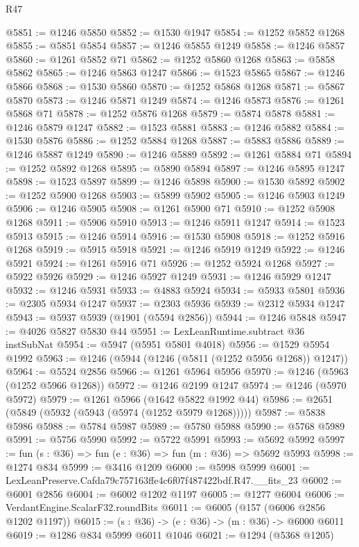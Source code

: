 \begin{lexlean}{R47}
\begin{coremodule}
@5851 := @1246 @5850
@5852 := @1530 @1947
@5854 := @1252 @5852 @1268
@5855 := @5851 @5854
@5857 := @1246 @5855 @1249
@5858 := @1246 @5857
@5860 := @1261 @5852 @71
@5862 := @1252 @5860 @1268
@5863 := @5858 @5862
@5865 := @1246 @5863 @1247
@5866 := @1523 @5865
@5867 := @1246 @5866
@5868 := @1530 @5860
@5870 := @1252 @5868 @1268
@5871 := @5867 @5870
@5873 := @1246 @5871 @1249
@5874 := @1246 @5873
@5876 := @1261 @5868 @71
@5878 := @1252 @5876 @1268
@5879 := @5874 @5878
@5881 := @1246 @5879 @1247
@5882 := @1523 @5881
@5883 := @1246 @5882
@5884 := @1530 @5876
@5886 := @1252 @5884 @1268
@5887 := @5883 @5886
@5889 := @1246 @5887 @1249
@5890 := @1246 @5889
@5892 := @1261 @5884 @71
@5894 := @1252 @5892 @1268
@5895 := @5890 @5894
@5897 := @1246 @5895 @1247
@5898 := @1523 @5897
@5899 := @1246 @5898
@5900 := @1530 @5892
@5902 := @1252 @5900 @1268
@5903 := @5899 @5902
@5905 := @1246 @5903 @1249
@5906 := @1246 @5905
@5908 := @1261 @5900 @71
@5910 := @1252 @5908 @1268
@5911 := @5906 @5910
@5913 := @1246 @5911 @1247
@5914 := @1523 @5913
@5915 := @1246 @5914
@5916 := @1530 @5908
@5918 := @1252 @5916 @1268
@5919 := @5915 @5918
@5921 := @1246 @5919 @1249
@5922 := @1246 @5921
@5924 := @1261 @5916 @71
@5926 := @1252 @5924 @1268
@5927 := @5922 @5926
@5929 := @1246 @5927 @1249
@5931 := @1246 @5929 @1247
@5932 := @1246 @5931
@5933 := @4883 @5924
@5934 := @5933 @5801
@5936 := @2305 @5934 @1247
@5937 := @2303 @5936
@5939 := @2312 @5934 @1247
@5943 := @5937 @5939 (@1901 (@5594 @2856))
@5944 := @1246 @5848
@5947 := @4026 @5827 @5830 @44
@5951 := LexLeanRuntime.subtract @36 instSubNat
@5954 := @5947 (@5951 @5801 @4018)
@5956 := @1529 @5954 @1992
@5963 := @1246 (@5944 (@1246 (@5811 (@1252 @5956 @1268)) @1247))
@5964 := @5524 @2856
@5966 := @1261 @5964 @5956
@5970 := @1246 (@5963 (@1252 @5966 @1268))
@5972 := @1246 @2199 @1247
@5974 := @1246 (@5970 @5972)
@5979 := @1261 @5966 (@1642 @5822 @1992 @44)
@5986 := @2651 (@5849 (@5932 (@5943 (@5974 (@1252 @5979 @1268)))))
@5987 := @5838 @5986
@5988 := @5784 @5987
@5989 := @5780 @5988
@5990 := @5768 @5989
@5991 := @5756 @5990
@5992 := @5722 @5991
@5993 := @5692 @5992
@5997 := fun (s : @36) => fun (e : @36) => fun (m : @36) => @5692 @5993
@5998 := @1274 @834
@5999 := @3416 @1209
@6000 := @5998 @5999
@6001 := LexLeanPreserve.Cafda79c757163ffe4c6f07f487422bdf.R47.__fits_23
@6002 := @6001 @2856
@6004 := @6002 @1202 @1197
@6005 := @1277 @6004
@6006 := VerdantEngine.ScalarF32.roundBits
@6011 := @6005 (@157 (@6006 @2856 @1202 @1197))
@6015 := (s : @36) -> (e : @36) -> (m : @36) -> @6000 @6011
@6019 := @1286 @834 @5999 @6011 @1046
@6021 := @1294 (@5368 @1205)

\end{coremodule}
\end{lexlean}
